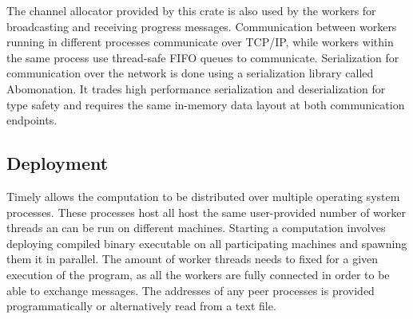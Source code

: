The channel allocator provided by this crate is also used by the workers for
broadcasting and receiving progress messages. Communication between workers
running in different processes communicate over TCP/IP, while workers within
the same process use thread-safe FIFO queues to communicate.
Serialization for communication over the network is done using a serialization
library called Abomonation. It trades high performance serialization and 
deserialization for type safety and requires the same in-memory data layout
at both communication endpoints.

\subsection{Deployment}

Timely allows the computation to be distributed over multiple operating system
processes. These processes host all host the same user-provided number of
worker threads an can be run on different machines. Starting a computation
involves deploying compiled binary executable on all participating machines
and spawning them it in parallel.
The amount of worker threads needs to fixed for a given execution of the
program, as all the workers are fully connected in order to be able to exchange
messages. The addresses of any peer processes is provided programmatically
or alternatively read from a text file.

